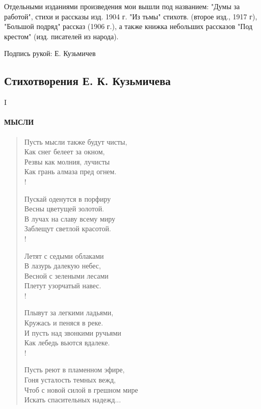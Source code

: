 \documentclass[]{memoir}
\begin{document}
Отдельными изданиями произведения мои вышли под названием: "Думы за работой", стихи и рассказы изд. 1904 г. "Из тьмы" стихотв. (второе изд., 1917 г), "Большой подряд" рассказ (1906 г.), а также книжка небольших рассказов "Под крестом" (изд. писателей из народа).

Подпись рукой: Е. Кузьмичев


\subsection{Стихотворения Е. К. Кузьмичева}

I

\paragraph{МЫСЛИ}

\begin{verse}
Пусть мысли также будут чисты,\\
          Как снег белеет за окном,\\
Резвы как молния, лучисты\\
          Как грань алмаза пред огнем.\\!

Пускай оденутся в порфиру\\
          Весны цветущей золотой.\\
В лучах на славу всему миру\\
          Заблещут светлой красотой.\\!

Летят с седыми облаками\\
          В лазурь далекую небес,\\
Весной с зелеными лесами\\
          Плетут узорчатый навес.\\!

Плывут за легкими ладьями,\\
          Кружась и пеняся в реке.\\
И пусть над звонкими ручьями\\
          Как лебедь вьются вдалеке.\\!

Пусть реют в пламенном эфире,\\
          Гоня усталость темных вежд,\\
Чтоб с новой силой в грешном мире\\
          Искать спасительных надежд...
\end{verse}
\end{document}
